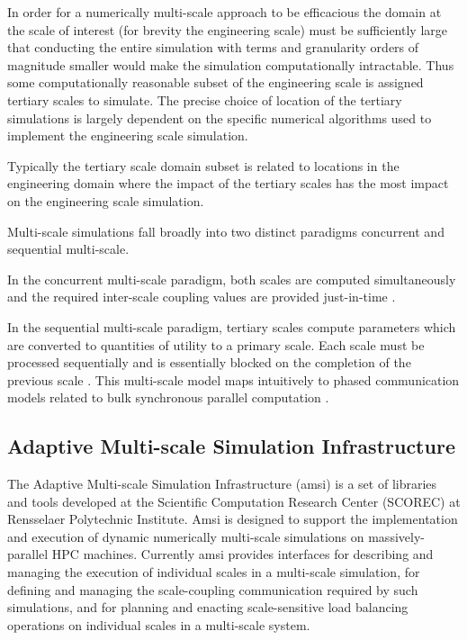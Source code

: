 \documentclass[11pt]{siamltex1213}
\begin{document}
In order for a numerically multi-scale approach to be efficacious the domain at the scale of interest (for brevity the engineering scale) must be sufficiently large that conducting the entire simulation with terms and granularity orders of magnitude smaller would make the simulation computationally intractable. Thus some computationally reasonable subset of the engineering scale is assigned tertiary scales to simulate. The precise choice of location of the tertiary simulations is largely dependent on the specific numerical algorithms used to implement the engineering scale simulation. 

Typically the tertiary scale domain subset is related to locations in the engineering domain where the impact of the tertiary scales has the most impact on the engineering scale simulation. 

\label{multiscale_paradigms}
Multi-scale simulations fall broadly into two distinct paradigms concurrent and sequential multi-scale.

In the concurrent multi-scale paradigm, both scales are computed simultaneously and the required inter-scale coupling values are provided just-in-time \cite{zeng2010concurrent}.

In the sequential multi-scale paradigm, tertiary scales compute parameters which are converted to quantities of utility to a primary scale. Each scale must be processed sequentially and is essentially blocked on the completion of the previous scale \cite{garcia2008sequential}. This multi-scale model maps intuitively to phased communication models related to bulk synchronous parallel computation \cite{valiant1990bridging}. 


\subsection{Adaptive Multi-scale Simulation Infrastructure}\label{amsi}
The Adaptive Multi-scale Simulation Infrastructure (amsi) is a set of libraries and tools developed at the Scientific Computation Research Center (SCOREC) at Rensselaer Polytechnic Institute. Amsi is designed to support the implementation and execution of dynamic numerically multi-scale simulations on massively-parallel HPC machines. Currently amsi provides interfaces for describing and managing the execution of individual scales in a multi-scale simulation, for defining and managing the scale-coupling communication required by such simulations, and for planning and enacting scale-sensitive load balancing operations on individual scales in a multi-scale system. 
\end{document}
